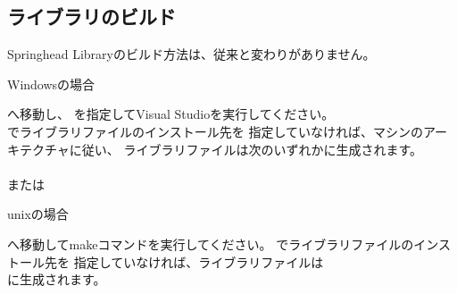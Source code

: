 \subsection{ライブラリのビルド}
\label{subsec:BuildLibrary}

\noindent
Springhead Libraryのビルド方法は、従来と変わりがありません。

\noindent
Windowsの場合
\begin{narrow}
	\build へ移動し、
	を指定してVisual Studioを実行してください。\\
	でライブラリファイルのインストール先を
	指定していなければ、マシンのアーキテクチャに従い、
	ライブラリファイルは次のいずれかに生成されます。\\
	\hspace{20pt}\\
	または\\
	\hspace{20pt}
\end{narrow}

\noindent
unixの場合
\begin{narrow}
	\build へ移動してmakeコマンドを実行してください。
	でライブラリファイルのインストール先を
	指定していなければ、ライブラリファイルは\\
	\hspace{20pt}
	に生成されます。
\end{narrow}

